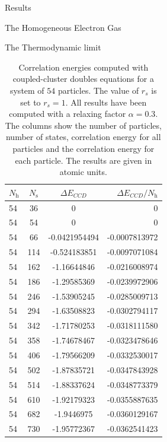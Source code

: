 \documentclass[twoside,english]{uiofysmaster}
\begin{document}
\begin{chapter}{Results}
\begin{section}{The Homogeneous Electron Gas}
\begin{subsection}{The Thermodynamic limit}
			\begin{table}[H]
				\begin{center}
					\begin{tabular}[center]{l  c  c r}
						$N_{\text{h}}$ & $N_{\text{s}}$ & $\Delta E_{CCD}$ & $\Delta E_{CCD}/N_{\text{h}}$ \\
						\hline
						54 & 36 & 0 & 0 \\
						54 & 54 & 0 & 0 \\
						54 &  66 & -0.0421954494 &-0.0007813972\\
						54 &  114 & -0.524183851 &-0.0097071084  \\
						54 &  162 & -1.16644846  &-0.0216008974 \\
						54 & 186 & -1.29585369   &-0.0239972906 \\
						54 & 246 & -1.53905245   &-0.0285009713 \\
						54 & 294 & -1.63508823   &-0.0302794117 \\
						54 & 342 & -1.71780253   &-0.0318111580 \\
						54 & 358 & -1.74678467   &-0.0323478646 \\
						54 & 406 & -1.79566209   &-0.0332530017 \\
						54 & 502 & -1.87835721   &-0.0347843928 \\
						54 & 514 & -1.88337624   &-0.0348773379 \\
						54 & 610 & -1.92179323   &-0.0355887635 \\
						54 & 682 & -1.9446975    &-0.0360129167 \\
						54 & 730 & -1.95772367   &-0.0362541423 
					\end{tabular}
				\end{center}
				\caption{Correlation energies computed with coupled-cluster doubles equations for a system of $54$ particles. The value of $r_s$ is set to $r_s=1$. All results have been computed with a relaxing factor $\alpha=0.3$. The columns show the number of particles, number of states, correlation energy for all particles and the correlation energy for each particle. The results are given in atomic units.}
				\label{table:ThermodynamicLimit3}
			\end{table}


\end{subsection}
\end{section}
\end{chapter}
\end{document}
